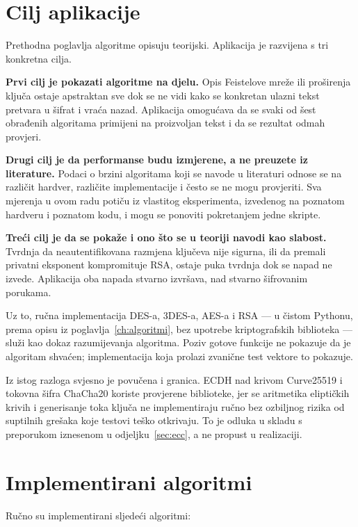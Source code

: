\section{Cilj aplikacije}
\label{sec:cilj}

Prethodna poglavlja algoritme opisuju teorijski. Aplikacija je razvijena s tri konkretna cilja.

\textbf{Prvi cilj je pokazati algoritme na djelu.} Opis Feistelove mreže ili proširenja ključa ostaje apstraktan sve dok se ne vidi kako se konkretan ulazni tekst pretvara u šifrat i vraća nazad. Aplikacija omogućava da se svaki od šest obrađenih algoritama primijeni na proizvoljan tekst i da se rezultat odmah provjeri.

\textbf{Drugi cilj je da performanse budu izmjerene, a ne preuzete iz literature.} Podaci o brzini algoritama koji se navode u literaturi odnose se na različit hardver, različite implementacije i često se ne mogu provjeriti. Sva mjerenja u ovom radu potiču iz vlastitog eksperimenta, izvedenog na poznatom hardveru i poznatom kodu, i mogu se ponoviti pokretanjem jedne skripte.

\textbf{Treći cilj je da se pokaže i ono što se u teoriji navodi kao slabost.} Tvrdnja da neautentifikovana razmjena ključeva nije sigurna, ili da premali privatni eksponent kompromituje RSA, ostaje puka tvrdnja dok se napad ne izvede. Aplikacija oba napada stvarno izvršava, nad stvarno šifrovanim porukama.

Uz to, ručna implementacija DES-a, 3DES-a, AES-a i RSA --- u čistom Pythonu, prema opisu iz poglavlja~\ref{ch:algoritmi}, bez upotrebe kriptografskih biblioteka --- služi kao dokaz razumijevanja algoritma. Poziv gotove funkcije ne pokazuje da je algoritam shvaćen; implementacija koja prolazi zvanične test vektore to pokazuje.

Iz istog razloga svjesno je povučena i granica. ECDH nad krivom Curve25519 i tokovna šifra ChaCha20 koriste provjerene biblioteke, jer se aritmetika eliptičkih krivih i generisanje toka ključa ne implementiraju ručno bez ozbiljnog rizika od suptilnih grešaka koje testovi teško otkrivaju. To je odluka u skladu s preporukom iznesenom u odjeljku~\ref{sec:ecc}, a ne propust u realizaciji.

\section{Implementirani algoritmi}
\label{sec:algoritmi-impl}

Ručno su implementirani sljedeći algoritmi:

